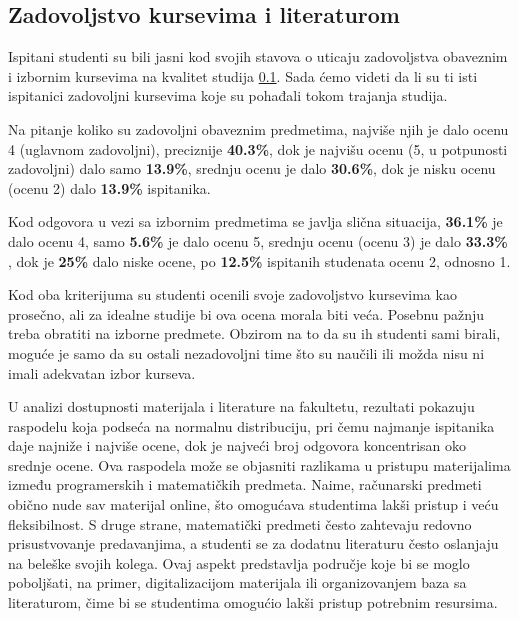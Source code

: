 \documentclass[a4paper]{article}
\begin{document}
\subsection{Zadovoljstvo kursevima i literaturom}
\label{subsec:zadovoljstvo_iskustva}
Ispitani studenti su bili jasni kod svojih stavova o uticaju zadovoljstva obaveznim i izbornim kursevima na kvalitet studija \ref{subsec:zadovoljstvo_iskustva}. Sada ćemo videti da li su ti isti ispitanici zadovoljni kursevima koje su pohađali tokom trajanja studija.

Na pitanje koliko su zadovoljni obaveznim predmetima, najviše njih je dalo ocenu 4 (uglavnom zadovoljni), preciznije \textbf{40.3\%}, dok je najvišu ocenu (5, u potpunosti zadovoljni) dalo samo \textbf{13.9\%}, srednju ocenu je dalo \textbf{30.6\%}, dok je nisku ocenu (ocenu 2) dalo \textbf{13.9\%} ispitanika.

Kod odgovora u vezi sa izbornim predmetima se javlja slična situacija, \textbf{36.1\%} je dalo ocenu 4, samo \textbf{5.6\%} je dalo ocenu 5, srednju ocenu (ocenu 3) je dalo \textbf{33.3\%} , dok je \textbf{25\%} dalo niske ocene, po \textbf{12.5\%} ispitanih studenata ocenu 2, odnosno 1.

Kod oba kriterijuma su studenti ocenili svoje zadovoljstvo kursevima kao prosečno, ali za idealne studije bi ova ocena morala biti veća. Posebnu pažnju treba obratiti na izborne predmete. Obzirom na to da su ih studenti sami birali, moguće je samo da su ostali nezadovoljni time što su naučili ili možda nisu ni imali adekvatan izbor kurseva. 

U analizi dostupnosti materijala i literature na fakultetu, rezultati pokazuju raspodelu koja podseća na normalnu distribuciju, pri čemu najmanje ispitanika daje najniže i najviše ocene, dok je najveći broj odgovora koncentrisan oko srednje ocene. Ova raspodela može se objasniti razlikama u pristupu materijalima između programerskih i matematičkih predmeta. Naime, računarski predmeti obično nude sav materijal online, što omogućava studentima lakši pristup i veću fleksibilnost. S druge strane, matematički predmeti često zahtevaju redovno prisustvovanje predavanjima, a studenti se za dodatnu literaturu često oslanjaju na beleške svojih kolega. Ovaj aspekt predstavlja područje koje bi se moglo poboljšati, na primer, digitalizacijom materijala ili organizovanjem baza sa literaturom, čime bi se studentima omogućio lakši pristup potrebnim resursima.
\end{document}
